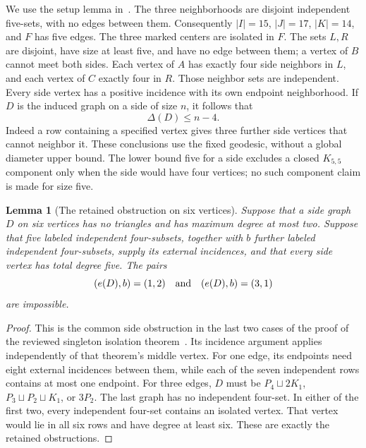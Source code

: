 \documentclass[11pt]{article}
\newtheorem{lemma}[theorem]{Lemma}
\begin{document}
We use the setup lemma in~\cite{singleton}. The three neighborhoods are
disjoint independent five-sets, with no edges between them. Consequently
$|I|=15$, $|J|=17$, $|K|=14$, and $F$ has five edges. The three marked
centers are isolated in $F$. The sets $L,R$ are disjoint, have size at
least five, and have no edge between them; a vertex of $B$ cannot meet
both sides. Each vertex of $A$ has exactly four side neighbors in $L$,
and each vertex of $C$ exactly four in $R$. Those neighbor sets are
independent. Every side vertex has a positive incidence with its own
endpoint neighborhood. If $D$ is the induced graph on a side of size
$n$, it follows that
\begin{equation}\label{degreebound}
 \Delta(D)\leq n-4.
\end{equation}
Indeed a row containing a specified vertex gives three further side
vertices that cannot neighbor it. These conclusions use the fixed
geodesic, without a global diameter upper bound. The lower bound five
for a side excludes a closed $K_{5,5}$ component only when the side
would have four vertices; no such component claim is made for size five.

\begin{lemma}[The retained obstruction on six vertices]\label{six}
Suppose that a side graph $D$ on six vertices has no triangles and has
maximum degree at most two. Suppose that five labeled independent
four-subsets, together with $b$ further labeled independent four-subsets,
supply its external incidences, and that every side vertex has total
degree five. The pairs
\[
 (e(D),b)=(1,2)\quad\hbox{and}\quad(e(D),b)=(3,1)
\]
are impossible.
\end{lemma}
\begin{proof}
This is the common side obstruction in the last two cases of the proof
of the reviewed singleton isolation theorem~\cite[Theorem~2]{singleton}.
Its incidence argument applies independently of that theorem's middle
vertex. For one edge, its endpoints need eight external incidences
between them, while each of the seven independent rows contains at most
one endpoint. For three edges, $D$ must be
$P_4\sqcup2K_1$, $P_3\sqcup P_2\sqcup K_1$, or $3P_2$.
The last graph has no independent four-set. In either of the first two,
every independent four-set contains an isolated vertex. That vertex
would lie in all six rows and have degree at least six. These are
exactly the retained obstructions.
\end{proof}
\end{document}
